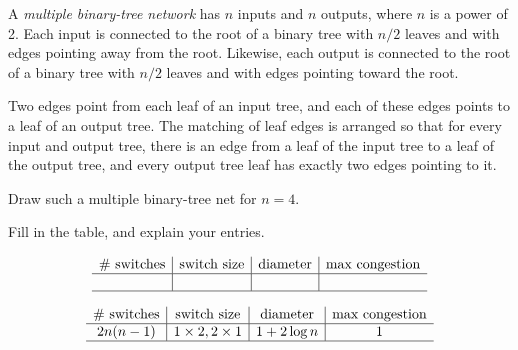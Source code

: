 \documentclass[12pt,twoside]{article}
\begin{document}
\begin{problem}
A \emph{multiple binary-tree network} has $n$ inputs and $n$ outputs, where $n$ is
a power of 2.  Each input is connected to the root of a binary tree with
$n/2$ leaves and with edges pointing away from the root.  Likewise, each
output is connected to the root of a binary tree with $n/2$ leaves and
with edges pointing toward the root.

Two edges point from each leaf of an input tree, and each of these edges
points to a leaf of an output tree.  The matching of leaf edges is
arranged so that for every input and output tree, there is an edge from a
leaf of the input tree to a leaf of the output tree, and every output tree
leaf has exactly two edges pointing to it.

\bparts
\ppart Draw such a multiple binary-tree net for $n=4$.


\ppart Fill in the table, and explain your entries.

{\large
\[
\begin{array}{c|c|c|c}
\text{\# switches} &
\text{switch size} &
\text{diameter} &
\text{max congestion} \\ \hline
&&&\\ \hline
\end{array}
\]
}

\begin{solution}
{\large
\[
\begin{array}{c|c|c|c}
\text{\# switches} &
\text{switch size} &
\text{diameter} &
\text{max congestion} \\ \hline
2n(n-1)& 1 \times 2, 2 \times 1 & 1+ 2\log n & 1\\ \hline
\end{array}
\]
}


\end{solution}
\end{problem}
\end{document}
